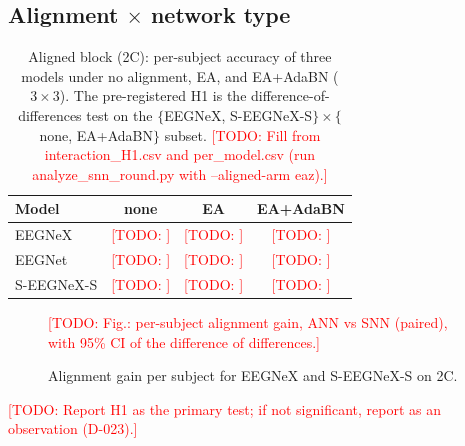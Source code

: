 \documentclass{article}
\newcommand{\todo}[1]{\textcolor{red}{[TODO: #1]}}
\begin{document}
\subsection{Alignment $\times$ network type}
\label{ssec:interaction}
\begin{table}[t]
  \centering
  \caption{Aligned block (2C): per-subject accuracy of three models under no alignment, EA, and EA+AdaBN ($3\times 3$). The pre-registered H1 is the difference-of-differences test on the $\{$EEGNeX, S-EEGNeX-S$\}\times\{$none, EA+AdaBN$\}$ subset. \todo{Fill from interaction\_H1.csv and per\_model.csv (run analyze\_snn\_round.py with --aligned-arm eaz).}}
  \label{tab:align}
  \small
  \begin{tabular}{lccc}
    \toprule
    Model & none & EA & EA+AdaBN \\
    \midrule
    EEGNeX & \todo{} & \todo{} & \todo{} \\
    EEGNet & \todo{} & \todo{} & \todo{} \\
    S-EEGNeX-S & \todo{} & \todo{} & \todo{} \\
    \bottomrule
  \end{tabular}
\end{table}
\begin{figure}[t]
  \centering
  \todo{Fig.: per-subject alignment gain, ANN vs SNN (paired), with 95\% CI of the difference of differences.}
  \caption{Alignment gain per subject for EEGNeX and S-EEGNeX-S on 2C.}
  \label{fig:interaction}
\end{figure}
\todo{Report H1 as the primary test; if not significant, report as an observation (D-023).}
\end{document}
